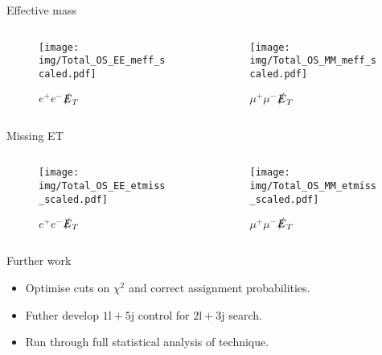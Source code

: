 \documentclass{beamer}
\begin{document}
\begin{frame}{Effective mass}
  \begin{columns}
    \begin{column}{0.45\textwidth}\begin{figure}
      \caption{$e^{+}e^{-}$$\slashed{E}_{T}$}
      \texttt{[image: img/Total\_OS\_EE\_meff\_scaled.pdf]}
    \end{figure}\end{column}
    \begin{column}{0.45\textwidth}\begin{figure}
      \caption{$\mu^{+}\mu^{-}$$\slashed{E}_{T}$}
      \texttt{[image: img/Total\_OS\_MM\_meff\_scaled.pdf]}
    \end{figure}\end{column}
  \end{columns}
\end{frame}

\begin{frame}{Missing ET}
  \begin{columns}
    \begin{column}{0.45\textwidth}\begin{figure}
      \caption{$e^{+}e^{-}$$\slashed{E}_{T}$}
      \texttt{[image: img/Total\_OS\_EE\_etmiss\_scaled.pdf]}
    \end{figure}\end{column}
    \begin{column}{0.45\textwidth}\begin{figure}
      \caption{$\mu^{+}\mu^{-}$$\slashed{E}_{T}$}
      \texttt{[image: img/Total\_OS\_MM\_etmiss\_scaled.pdf]}
    \end{figure}\end{column}
  \end{columns}
\end{frame}

\begin{frame}{Further work}
  \begin{itemize}
    \item Optimise cuts on $\chi^2$ and correct assignment probabilities.
    \item Futher develop $1\text{l}+5\text{j}$ control for $2\text{l}+3\text{j}$ search.
    \item Run through full statistical analysis of technique.
  \end{itemize}
\end{frame}

\end{document}
